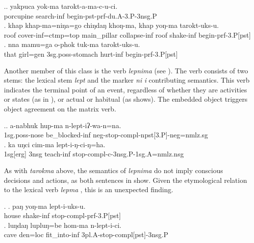 \ex.\ag. yakpuca yok-ma tarokt-a-ma-c-u-ci.\\
porcupine search-{\sc inf} begin{\sc -pst-prf-du.A-3.P-3nsg.P}\\
\bg. khap khap-ma=niŋa=go chiŋdaŋ  khoŋ-ma,  khap yoŋ-ma tarokt-uks-u.\\
		roof cover{\sc -inf=ctmp=top} main\_pillar collapse{\sc -inf} 	roof  shake{\sc -inf} begin{\sc [3sg.A]-prf-3.P[pst]}	\\
	 
\bg. nna  mamu=ga    o-phok            tuk-ma           tarokt-uks-u.\\
that girl{\sc =gen} {\sc 3sg.poss-}stomach hurt{\sc -inf} begin{\sc [3sg.A]-prf-3.P[pst]}\\
 


Another member of this class is the  verb \emph{lepnima}   (see \Next). The verb consists of two stems: the lexical stem \emph{lept}  and the marker \emph{ni \ti i} contributing  semantics. This verb indicates the terminal point of an event, regardless of whether  they are activities or states (as in \Next[a]), or actual or habitual (as \Next[b] shows).  The embedded object triggers object agreement on the matrix verb.

\ex.\ag. a-nabhuk hup-ma n-lept-iʔ-wa-n=na.\\
{\sc 1sg.poss}-nose be\_blocked{\sc -inf} {\sc neg}-stop{\sc [3sg.A]-compl-npst[3.P]-neg=nmlz.sg}\\
\bg. ka uŋci cim-ma lept-i-ŋ-ci-ŋ=ha.\\
{\sc 1sg[erg]} {\sc 3nsg} teach{\sc -inf} stop-{\sc compl-c-3nsg.P-1sg.A=nmlz.nsg}\\

As with \emph{tarokma} above, the semantics of \emph{lepnima} do not imply conscious decisions and actions, as both sentences in \Next show. Given the etymological relation to the lexical verb \emph{lepma} , this is an unexpected finding. 

\ex. \ag. paŋ  yoŋ-ma     lept-i-uks-u.\\
house shake{\sc -inf} stop{\sc [3sg.A]-compl-prf-3.P[pst]}\\
 
\bg. luŋdaŋ  lupluŋ=be    hom-ma n-lept-i-ci.\\
cave den{\sc =loc} fit\_into-{\sc inf} {\sc 3pl.A-}stop-{\sc compl[pst]-3nsg.P}\\
 



